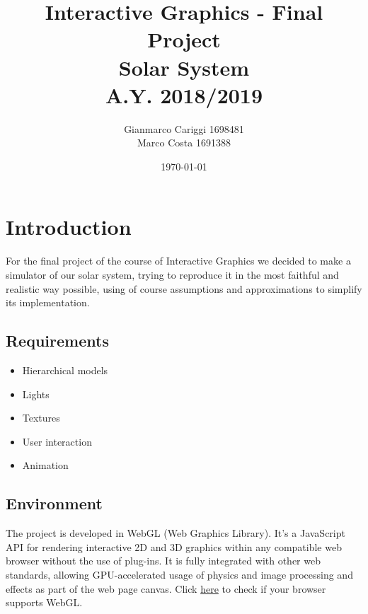 \documentclass{article}
\begin{document}
\title{\textbf{Interactive Graphics - Final Project}
		\\ \medskip \textbf{Solar System}
		\\ \medskip \large A.Y. 2018/2019 }
\date{\today}
\author{Gianmarco Cariggi 1698481 \\ \medskip Marco Costa 1691388}
\maketitle



\section{Introduction}
For the final project of the course of Interactive Graphics we decided to make a simulator of our solar system, trying to reproduce it in the most faithful and realistic way possible, using of course assumptions and approximations to simplify its implementation.


\subsection{Requirements}
\begin{itemize}
	\item Hierarchical models
	\item Lights
	\item Textures
	\item User interaction
	\item Animation
\end{itemize}


\subsection{Environment}
The project is developed in WebGL (Web Graphics Library). It's a JavaScript API for rendering interactive 2D and 3D graphics within any compatible web browser without the use of plug-ins. It is fully integrated with other web standards, allowing GPU-accelerated usage of physics and image processing and effects as part of the web page canvas.
\newline
Click \href{https://get.webgl.org/}{here} to check if your browser supports WebGL.
\end{document}
